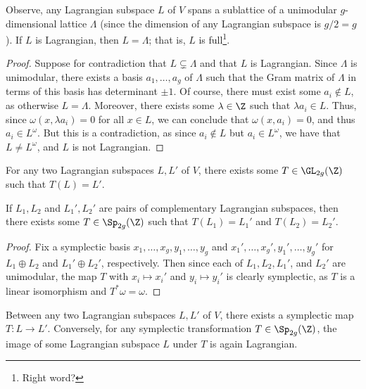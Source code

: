 \begin{proposition}
	\label{prp:lagrangian_unimodular}
	Observe, any Lagrangian subspace $L$ of $V$ spans a sublattice of a unimodular $g$-dimensional lattice $\Lambda$ (since the dimension of any Lagrangian subspace is $g/2 = g$). If $L$ is Lagrangian, then $L = \Lambda$; that is, $L$ is full\footnote{Right word?}.
\end{proposition}
\begin{proof}
	Suppose for contradiction that $L \subsetneq \Lambda$ and that $L$ is Lagrangian. Since $\Lambda$ is unimodular, there exists a basis $a_1,\dots,a_g$ of $\Lambda$ such that the Gram matrix of $\Lambda$ in terms of this basis has determinant $\pm 1$. Of course, there must exist some $a_i \notin L$, as otherwise $L = \Lambda$. Moreover, there exists some $\lambda \in \Z$ such that $\lambda a_i \in L$. Thus, since $\omega(x, \lambda a_i) = 0$ for all $x \in L$, we can conclude that $\omega(x, a_i) = 0$, and thus $a_i \in L^\omega$. But this is a contradiction, as since $a_i \notin L$ but $a_i \in L^\omega$, we have that $L \neq L^\omega$, and $L$ is not Lagrangian.
\end{proof}

\begin{corollary}
	For any two Lagrangian subspaces $L,L'$ of $V$, there exists some $T \in \GL_{2g}(\Z)$ such that $T(L) = L'$.
\end{corollary}

\begin{proposition}
	If $L_1,L_2$ and $L_1',L_2'$ are pairs of complementary Lagrangian subspaces, then there exists some $T \in \Sp_{2g}(\Z)$ such that $T(L_1) = L_1'$ and $T(L_2) = L_2'$.
\end{proposition}
\begin{proof}
	Fix a symplectic basis $x_1,\dots,x_g,y_1,\dots,y_g$ and $x_1',\dots,x_g',y_1',\dots,y_g'$ for $L_1 \oplus L_2$ and $L_1' \oplus L_2'$, respectively. Then since each of $L_1,L_2,L_1'$, and $L_2'$ are unimodular, the map $T$ with $x_i \mapsto x_i'$ and $y_i \mapsto y_i'$ is clearly symplectic, as $T$ is a linear isomorphism and $T^*\omega = \omega$.
\end{proof}

\begin{corollary}
	\label{cor:symplectic_existence}
	Between any two Lagrangian subspaces $L,L'$ of $V$, there exists a symplectic map $T: L \to L'$. Conversely, for any symplectic transformation $T \in \Sp_{2g}(\Z)$, the image of some Lagrangian subspace $L$ under $T$ is again Lagrangian.
\end{corollary}

